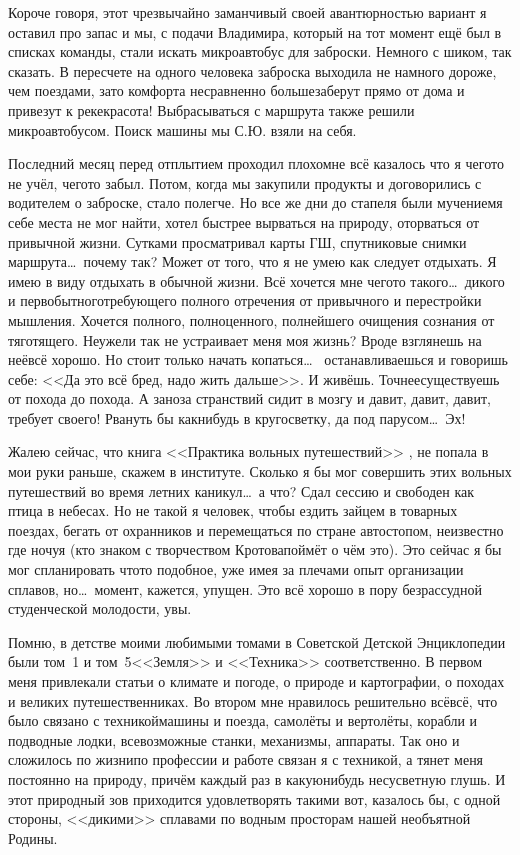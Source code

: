 Короче говоря, этот чрезвычайно заманчивый своей авантюрностью вариант я оставил про запас и мы, с подачи Владимира, который на тот момент ещё был в списках команды, стали искать микроавтобус для заброски. Немного с шиком, так сказать. В пересчете на одного человека заброска выходила не намного дороже, чем поездами, зато комфорта несравненно больше\mdash заберут прямо от дома и привезут к реке\mdash  красота! Выбрасываться с маршрута также решили микроавтобусом. Поиск машины мы С.Ю. взяли на себя.

Последний месяц перед отплытием проходил плохо\mdash  мне всё казалось что я чего\sdash то не учёл, чего\sdash то забыл. Потом, когда мы закупили продукты и договорились с водителем о заброске, стало полегче. Но все же дни до стапеля были мучением\mdash я себе места не мог найти, хотел быстрее вырваться на природу, оторваться от привычной жизни. Сутками просматривал карты ГШ, спутниковые снимки маршрута\ldots~почему так? Может от того, что я не умею как следует отдыхать. Я имею в виду отдыхать в обычной жизни. Всё хочется мне чего\sdash то такого\ldots~дикого и первобытного\mdash  требующего полного отречения от привычного и перестройки мышления. Хочется полного, полноценного, полнейшего очищения сознания от тяготящего.  Неужели так не устраивает меня моя жизнь? Вроде взглянешь на неё\mdash всё хорошо. Но стоит только начать копаться\ldots~ останавливаешься и говоришь себе: <<Да это всё бред, надо жить дальше>>. И живёшь. Точнее\mdash существуешь от похода до похода. А заноза странствий сидит в мозгу и давит, давит, давит, требует своего! Рвануть бы как\sdash нибудь в кругосветку, да под парусом\ldots~Эх!

Жалею сейчас, что книга <<Практика вольных путешествий>> \cite{Кротов}, не попала в мои руки раньше, скажем в институте. Сколько я бы мог совершить этих вольных путешествий во время летних каникул\ldots~а что? Сдал сессию и свободен как птица в небесах. Но не такой я человек, чтобы ездить зайцем в товарных поездах, бегать от охранников и перемещаться по стране автостопом, неизвестно где ночуя (кто знаком с творчеством Кротова\mdash поймёт о чём это). Это сейчас я бы мог спланировать что\sdash то подобное, уже имея за плечами опыт организации сплавов, но\ldots~момент, кажется, упущен. Это всё хорошо в пору безрассудной студенческой молодости, увы.

Помню, в детстве моими любимыми томами в Советской Детской Энциклопедии были том~1 и том~5\mdash <<Земля>> и <<Техника>> соответственно. В первом меня привлекали статьи о климате и погоде, о природе и картографии, о походах и великих путешественниках. Во втором мне нравилось решительно всё\mdash всё, что было связано с техникой\mdash машины и поезда, самолёты и вертолёты, корабли и подводные лодки, всевозможные станки, механизмы, аппараты. Так оно и сложилось по жизни\mdash по профессии и работе связан я с техникой, а тянет меня постоянно на природу, причём каждый раз в какую\sdash нибудь несусветную глушь. И этот природный зов приходится удовлетворять такими вот, казалось бы, с одной стороны, <<дикими>> сплавами по водным просторам нашей необъятной Родины.

